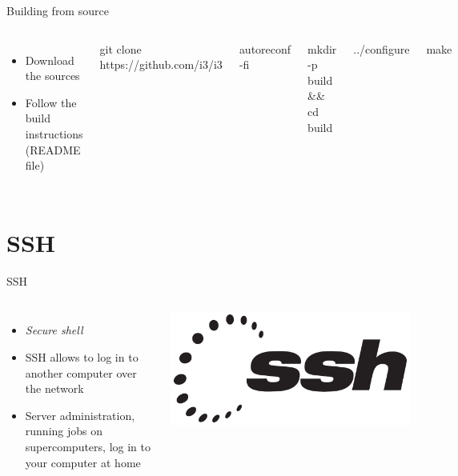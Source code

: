     \begin{frame}[t,fragile]{Building from source}
        \begin{columns}[T]
            \begin{itemize}
                \item Download the sources
                \item Follow the build instructions (README file)
            \end{itemize}
            \begin{bashenv}[\small]
git clone https://github.com/i3/i3
            \end{bashenv}
            \begin{bashenv}[\small]
autoreconf -fi
            \end{bashenv}
            \begin{bashenv}[\small]
mkdir -p build && cd build
            \end{bashenv}
            \begin{bashenv}[\small]
../configure
            \end{bashenv}
            \begin{bashenv}[\small]
make
            \end{bashenv}
        \end{columns}
    \end{frame}

    \section{SSH}

    \begin{frame}[t,fragile]{SSH}
        \begin{columns}[T]
            \begin{itemize}
                \item \emph{Secure shell}
                \item SSH allows to log in to another computer over the network
                \item Server administration, running jobs on supercomputers,
                    log in to your computer at home
            \end{itemize}
            \begin{center}
                \includegraphics[width=0.6\columnwidth]{img/ssh.png}
            \end{center}
        \end{columns}
    \end{frame}

